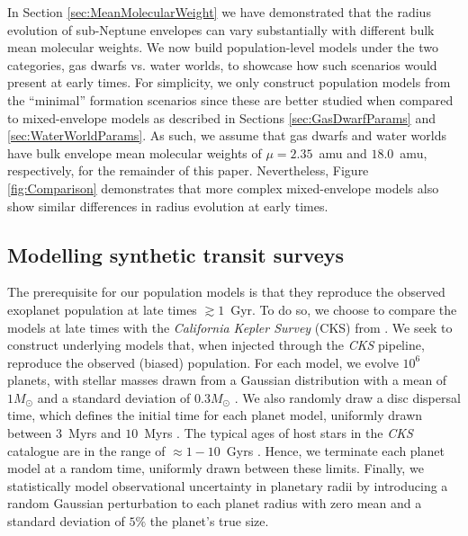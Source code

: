 \documentclass[fleqn,usenatbib]{mnras}
\begin{document}
In Section \ref{sec:MeanMolecularWeight} we have demonstrated that the radius evolution of sub-Neptune envelopes can vary substantially with different bulk mean molecular weights. We now build population-level models under the two categories, gas dwarfs vs. water worlds, to showcase how such scenarios would present at early times. For simplicity, we only construct population models from the ``minimal'' formation scenarios since these are better studied when compared to mixed-envelope models as described in Sections \ref{sec:GasDwarfParams} and \ref{sec:WaterWorldParams}. As such, we assume that gas dwarfs and water worlds have bulk envelope mean molecular weights of $\mu = 2.35$~amu and $18.0$~amu, respectively, for the remainder of this paper. Nevertheless, Figure \ref{fig:Comparison} demonstrates that more complex mixed-envelope models also show similar differences in radius evolution at early times. 

\subsection{Modelling synthetic transit surveys} \label{sec:survey}
The prerequisite for our population models is that they reproduce the observed exoplanet population at late times $\gtrsim 1$~Gyr. To do so, we choose to compare the models at late times with the \textit{California Kepler Survey} (CKS) from \citet{Petigura2022}. We seek to construct underlying models that, when injected through the \textit{CKS} pipeline, reproduce the observed (biased) population. For each model, we evolve $10^6$ planets, with stellar masses drawn from a Gaussian distribution with a mean of $1M_\odot$ and a standard deviation of $0.3M_\odot$ \citep{Rogers2021b}. We also randomly draw a disc dispersal time, which defines the initial time for each planet model, uniformly drawn between $3$~Myrs and $10$~Myrs \citep[e.g.][]{Kenyon1995,Ercolano2011,Koepferl2013}. The typical ages of host stars in the \textit{CKS} catalogue are in the range of $\approx 1-10$~Gyrs \citep[e.g.][]{Berger2020}. Hence, we terminate each planet model at a random time, uniformly drawn between these limits. Finally, we statistically model observational uncertainty in planetary radii by introducing a random Gaussian perturbation to each planet radius with zero mean and a standard deviation of $5\%$ the planet's true size.
\end{document}
